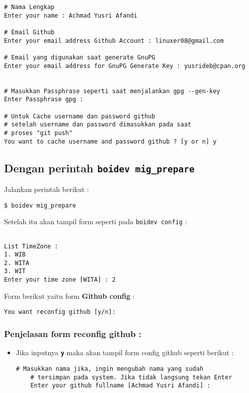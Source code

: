 {\begin{lstlisting}[language=ShellBash]
# Nama Lengkap
Enter your name : Achmad Yusri Afandi

# Email Github
Enter your email address Github Account : linuxer08@gmail.com

# Email yang digunakan saat generate GnuPG
Enter your email address for GnuPG Generate Key : yusrideb@cpan.org


# Masukkan Passphrase seperti saat menjalankan gpg --gen-key
Enter Passphrase gpg : 

# Untuk Cache username dan password github
# setelah username dan password dimasukkan pada saat 
# proses "git push"
You want to cache username and password github ? [y or n] y

\end{lstlisting}

\subsection{Dengan perintah \texttt{boidev mig\_prepare}}
\label{implm_2}
\noindent
Jalankan perintah berikut :

\begin{lstlisting}[language=ShellBash]
$ boidev mig_prepare
\end{lstlisting}

\noindent Setelah itu akan tampil form seperti pada \texttt{boidev config} :

\begin{lstlisting}[language=ShellBash]

List TimeZone : 
1. WIB 
2. WITA 
3. WIT 
Enter your time zone [WITA] : 2

\end{lstlisting}

\noindent
Form berikut yaitu form \textbf{Github config} :

\begin{lstlisting}[language=ShellBash]
You want reconfig github [y/n]:
\end{lstlisting}

\subsubsection{Penjelasan form \textbf{reconfig github} :}

\begin{itemize}
	\item Jika inputnya \textbf{\texttt{y}} maka akan tampil form config github seperti berikut :
	
	\begin{lstlisting}[language=ShellBash]
	# Masukkan nama jika, ingin mengubah nama yang sudah
	# tersimpan pada system. Jika tidak langsung tekan Enter
	Enter your github fullname [Achmad Yusri Afandi] : 
	

\end{lstlisting}
\end{itemize}}
